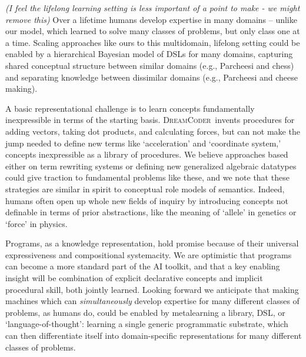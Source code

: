 \documentclass{article}
\newcommand{\system}{\textsc{DreamCoder}~}
\begin{document}
\emph{(I feel the lifelong learning setting is less important of a point to make - we might remove this)} Over a lifetime humans develop expertise in many domains --
unlike our model,
which learned to solve many classes of problems,
but only class one at a time.
Scaling approaches like ours to this multidomain, lifelong setting
could be enabled by a hierarchical Bayesian model of DSLs for many domains,
capturing  shared conceptual structure between similar domains  (e.g., Parcheesi and chess)
and separating knowledge between dissimilar domains (e.g., Parcheesi and cheese making).


A basic representational challenge is to
learn concepts fundamentally inexpressible in terms of the starting basis. \system invents procedures for
adding vectors, taking dot products, and calculating forces,
but can not make the jump needed to define new terms like `acceleration' and `coordinate system,'
concepts inexpressible as a library of procedures.
We believe approaches based either on term rewriting systems or defining new generalized algebraic datatypes could give traction to fundamental problems like these,
and we note that these strategies are similar in spirit to conceptual role models of semantics.
Indeed, humans often open up whole new fields of inquiry by introducing concepts not
definable in terms of prior abstractions,
like the meaning of `allele' in genetics
or `force' in physics.

Programs, as a knowledge representation,
hold promise because of their universal expressiveness and
compositional systemacity.
We are optimistic that programs can become a more standard part of the AI toolkit,
and that a key enabling insight will be combination of
explicit declarative concepts and implicit procedural skill, both jointly learned.
Looking forward we anticipate that making machines which can \emph{simultaneously}
develop expertise for many different classes of problems, as humans do,
could be enabled by metalearning a library, DSL, or `language-of-thought':
learning a single generic programmatic substrate,
which can then differentiate itself into domain-specific
representations for many different classes of problems.




\end{document}
